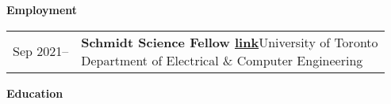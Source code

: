 \documentclass{scrartcl}
\begin{document}
\newcommand{\secttitle}[1]{{{\Large\textbf{#1}}}\par\medskip}
\newcommand{\sectsubtitle}[1]{{{\large\textbf{#1}}}\par\medskip}

\setlength{\tabcolsep}{0pt}
\newenvironment{entrylist}{%
  \begin{longtable}{@{\extracolsep{\fill}}ll}
}{%
  \end{longtable}
}
\newcommand{\entry}[4]{%
  {\addfontfeature{Color=gray} #1}&\parbox[t]{0.8\textwidth}{%
    \textbf{#2}\hfill #3\\ #4\vspace{\parsep}%
  }\\}
\newcommand{\refentry}[3]{%
  {\addfontfeature{Color=gray} #1}&\parbox[t]{0.8\textwidth}{%
    \raggedright#2\\ {{\raggedright\small #3}}\vspace{\parsep}%
  }\\}
\newcommand{\singleentry}[2]{%
  {\addfontfeature{Color=gray} #1}&\parbox[t]{0.8\textwidth}{%
    #2\vspace{\parsep}%
  }\\}
\newcommand{\splitentry}[4]{%
  {\addfontfeature{Color=gray} #1}&\parbox[t]{0.8\textwidth}{%
    \raggedright #2\hfill #3\\ \raggedright\small #4\vspace{\parsep}%
  }\\}


\raggedright

\secttitle{Employment}
\begin{entrylist}
\entry
{Sep 2021–}
{Schmidt Science Fellow \textnormal{\href{https://schmidtsciencefellows.org/fellow/suhas-mahesh/}{link}}}
{University of Toronto}
{Department of Electrical \& Computer Engineering}
\end{entrylist}

\secttitle{Education}
\end{document}
